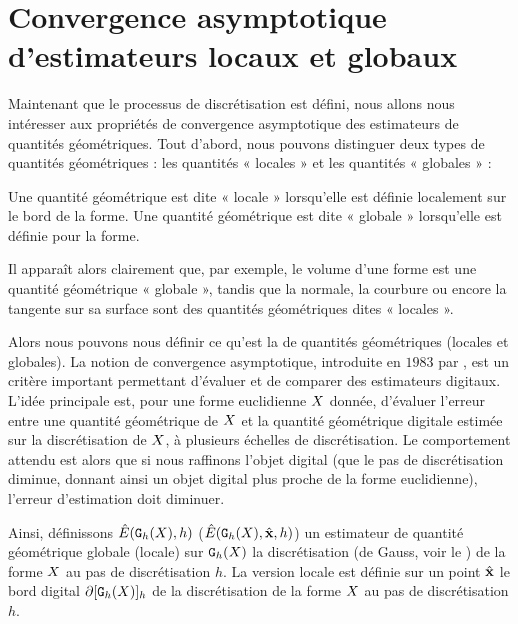 \section{Convergence asymptotique d'estimateurs locaux et globaux}
\label{sec:multigrid-convergence-estimator}
%
Maintenant que le processus de discrétisation est défini, nous allons nous
intéresser aux propriétés de convergence asymptotique des estimateurs de
quantités géométriques. Tout d'abord, nous pouvons distinguer deux types de
quantités géométriques : les quantités « locales » et les quantités « globales » :
%
\begin{definition}{}
  \label{def:global-quantity}
  Une quantité géométrique est dite « locale » lorsqu'elle est définie
  localement sur le bord de la forme. Une quantité géométrique est dite «
  globale » lorsqu'elle est définie pour la forme.
\end{definition}
%
Il apparaît alors clairement que, par exemple, le volume d'une forme est une
quantité géométrique « globale », tandis que la normale, la courbure ou encore
la tangente sur sa surface sont des quantités géométriques dites « locales ».


Alors nous pouvons nous définir ce qu'est la  de quantités géométriques (locales et globales). La notion de
convergence asymptotique, introduite en $1983$ par ,
est un critère important permettant d'évaluer et de comparer des estimateurs
digitaux. L'idée principale est, pour une forme euclidienne $X$ donnée,
d'évaluer l'erreur entre une quantité géométrique de $X$ et la quantité
géométrique digitale estimée sur la discrétisation de $X$, à plusieurs
échelles de discrétisation. Le comportement attendu est alors que si nous
raffinons l'objet digital (\cad que le pas de discrétisation diminue, donnant
ainsi un objet digital plus proche de la forme euclidienne), l'erreur
d'estimation doit diminuer.


Ainsi, définissons $\hat{E}(\mathtt{G}_{h}(X),h)$ (\respp $\hat{E}(\mathtt{G}_{h}(X),\hat{\mathbf{x}},h)$) un
estimateur de quantité géométrique globale (\resp locale) sur $\mathtt{G}_{h}(X)$ la
discrétisation (de Gauss, voir le ) de la forme
$X$ au pas de discrétisation $h$. La version locale est définie sur un
point $\hat{\mathbf{x}}$ le bord digital $\partial\lbrack \mathtt{G}_{h}(X) \rbrack_{h}$ de la discrétisation
de la forme $X$ au pas de discrétisation $h$.



